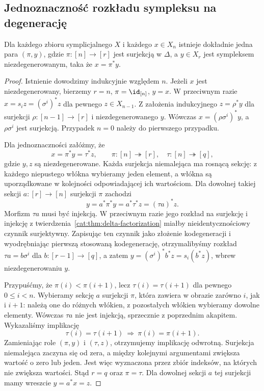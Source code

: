 \subsection{Jednoznaczność rozkładu sympleksu na degenerację}

\begin{lemat}\label{cat:lem:ez-degeneracy}
Dla każdego zbioru symplicjalnego $X$ i każdego $x\in X_n$ istnieje dokładnie jedna para $(\pi,y)$, gdzie $\pi:[n]\to[r]$ jest surjekcją w $\Delta$, a $y\in X_r$ jest sympleksem niezdegenerowanym, taka że $x=\pi^*y$.
\end{lemat}
\begin{proof}
Istnienie dowodzimy indukcyjnie względem $n$. Jeżeli $x$ jest niezdegenerowany, bierzemy $r=n$, $\pi=\id_{[n]}$, $y=x$. W przeciwnym razie $x=s_i z=(\sigma^i)^*z$ dla pewnego $z\in X_{n-1}$. Z założenia indukcyjnego $z=\rho^*y$ dla surjekcji $\rho:[n-1]\to[r]$ i niezdegenerowanego $y$. Wówczas $x=(\rho\sigma^i)^*y$, a $\rho\sigma^i$ jest surjekcją. Przypadek $n=0$ należy do pierwszego przypadku.

Dla jednoznaczności załóżmy, że
\[
 x=\pi^*y=\tau^*z,\qquad
 \pi:[n]\twoheadrightarrow[r],\quad
 \tau:[n]\twoheadrightarrow[q],
\]
gdzie $y,z$ są niezdegenerowane. Każda surjekcja niemalejąca ma rosnącą sekcję: z każdego niepustego włókna wybieramy jeden element, a włókna są uporządkowane w kolejności odpowiadającej ich wartościom. Dla dowolnej takiej sekcji $a:[r]\to[n]$ surjekcji $\pi$ zachodzi
\[
 y=a^*\pi^*y=a^*\tau^*z=(\tau a)^*z.
\]
Morfizm $\tau a$ musi być injekcją. W przeciwnym razie jego rozkład na surjekcję i injekcję z twierdzenia~\ref{cat:thm:delta-factorization} miałby nieidentycznościowy czynnik surjektywny. Zapisując ten czynnik jako złożenie kodegeneracji i wyodrębniając pierwszą stosowaną kodegenerację, otrzymalibyśmy rozkład $\tau a=b\sigma^i$ dla $b:[r-1]\to[q]$, a zatem $y=(\sigma^i)^*b^*z=s_i(b^*z)$, wbrew niezdegenerowaniu $y$.

Przypuśćmy, że $\pi(i)<\pi(i+1)$, lecz $\tau(i)=\tau(i+1)$ dla pewnego $0\leq i<n$. Wybieramy sekcję $a$ surjekcji $\pi$, która zawiera w obrazie zarówno $i$, jak i $i+1$: należą one do różnych włókien, z pozostałych włókien wybieramy dowolne elementy. Wówczas $\tau a$ nie jest injekcją, sprzecznie z poprzednim akapitem. Wykazaliśmy implikację
\[
 \tau(i)=\tau(i+1)\ \Longrightarrow\
 \pi(i)=\pi(i+1).
\]
Zamieniając role $(\pi,y)$ i $(\tau,z)$, otrzymujemy implikację odwrotną. Surjekcja niemalejąca zaczyna się od zera, a między kolejnymi argumentami zwiększa wartość o zero lub jeden. Jest więc wyznaczona przez zbiór indeksów, na których nie zwiększa wartości. Stąd $r=q$ oraz $\pi=\tau$. Dla dowolnej sekcji $a$ tej surjekcji mamy wreszcie $y=a^*x=z$.
\end{proof}

